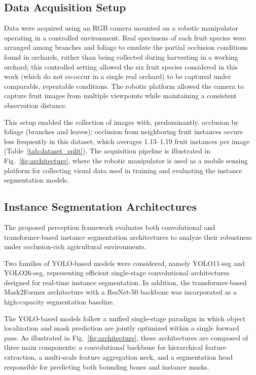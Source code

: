 \documentclass[runningheads]{llncs}
\begin{document}
\subsection{Data Acquisition Setup}
\label{sec:acquisition}

Data were acquired using an RGB camera mounted on a robotic manipulator
operating in a controlled environment. Real specimens of each fruit species
were arranged among branches and foliage to emulate the partial occlusion
conditions found in orchards, rather than being collected during harvesting
in a working orchard; this controlled setting allowed the six fruit species
considered in this work (which do not co-occur in a single real orchard) to
be captured under comparable, repeatable conditions. The robotic platform
allowed the camera to capture fruit images from multiple viewpoints while
maintaining a consistent observation distance.

This setup enabled the collection of images with, predominantly, occlusion by
foliage (branches and leaves); occlusion from neighboring fruit instances
occurs less frequently in this dataset, which averages 1.13--1.19 fruit
instances per image (Table~\ref{tab:dataset_split}). The acquisition pipeline
is illustrated in Fig.~\ref{fig:architecture}, where the robotic manipulator
is used as a mobile sensing platform for collecting visual data used in
training and evaluating the instance segmentation models.

\subsection{Instance Segmentation Architectures}

The proposed perception framework evaluates both convolutional and
transformer-based instance segmentation architectures to analyze their
robustness under occlusion-rich agricultural environments.

Two families of YOLO-based models were considered, namely YOLO11-seg and
YOLO26-seg, representing efficient single-stage convolutional architectures
designed for real-time instance segmentation. In addition, the transformer-based
Mask2Former architecture with a ResNet-50 backbone was incorporated as a
high-capacity segmentation baseline.

The YOLO-based models follow a unified single-stage paradigm in which object
localization and mask prediction are jointly optimized within a single forward
pass. As illustrated in Fig.~\ref{fig:architecture}, these architectures are
composed of three main components: a convolutional backbone for hierarchical
feature extraction, a multi-scale feature aggregation neck, and a segmentation
head responsible for predicting both bounding boxes and instance masks.
\end{document}
